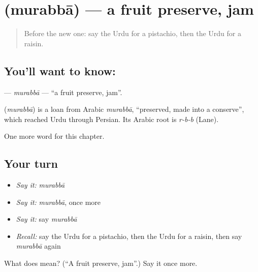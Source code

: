 \section[\texorpdfstring{\ur{مربہ} (murabbā)}{مربہ (murabbā)}]{ (murabbā) — a fruit preserve, jam}

\label{lesson:UR-C167-murabba}



\begin{quote}
Before the new one: say the Urdu for a pistachio, then the Urdu for a raisin.
\end{quote}

\subsection*{You'll want to know: }
\textbf{} — \emph{murabbā} — \textquotedblleft{}a fruit preserve, jam\textquotedblright{}.

\begin{cousinweb}
\textbf{} (\emph{murabbā}) is a loan from Arabic \emph{murabbā}, \textquotedblleft{}preserved, made into a conserve\textquotedblright{}, which reached Urdu through Persian. Its Arabic root is \emph{r-b-b} (Lane).
\end{cousinweb}

\begin{grammarlens}[title={What you've built}]
One more word for this chapter.
\end{grammarlens}

\subsection*{Your turn}
\begin{itemize}
\raggedright
  \item \emph{Say it:} \emph{murabbā}
  \item \emph{Say it:} \emph{murabbā}, once more
  \item \emph{Say it:} say \emph{murabbā}
  \item \emph{Recall:} say the Urdu for a pistachio, then the Urdu for a raisin, then say \emph{murabbā} again
\end{itemize}

\begin{tcolorbox}[breakable,colback=teal!4,colframe=teal!35!black,title={Before you move on}]
What does  mean? (\textquotedblleft{}A fruit preserve, jam\textquotedblright{}.) Say it once more.
\end{tcolorbox}
